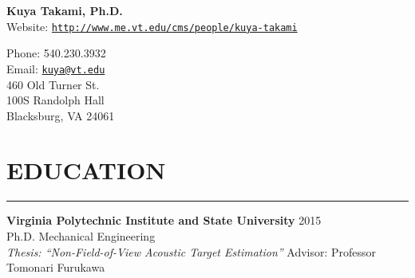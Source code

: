 \documentclass[11pt,letterpaper]{article}
\def\name{\bf Kuya Takami, Ph.D.}
\begin{document}
\rhead{}
\begin{minipage}{0.7\linewidth}
{\Huge \name}\\

\vspace{5mm}\hspace{4mm}
Website:  \href{http://www.me.vt.edu/cms/people/kuya-takami}{\tt http://www.me.vt.edu/cms/people/kuya-takami} \\

\end{minipage}
\hspace{2mm}
\begin{minipage}{0.6\linewidth} 
      Phone:  540.230.3932\\
	Email:  \href{mailto:kuya@vt.edu}{\tt kuya@vt.edu} \\
    460 Old Turner St.\\
  100S Randolph Hall\\
   Blacksburg, VA 24061\\
\end{minipage}

\section*{EDUCATION}\vspace{-3mm}
\hrule
\begin{minipage}{\columnwidth}
{\bf Virginia Polytechnic Institute and State University}\hspace{1mm} 2015\\
\hspace{5mm}Ph.D.  Mechanical Engineering   \\
\hspace{10mm}
{\it Thesis: ``Non-Field-of-View Acoustic Target Estimation''} Advisor: Professor Tomonari Furukawa
\end{minipage}
\end{document}
